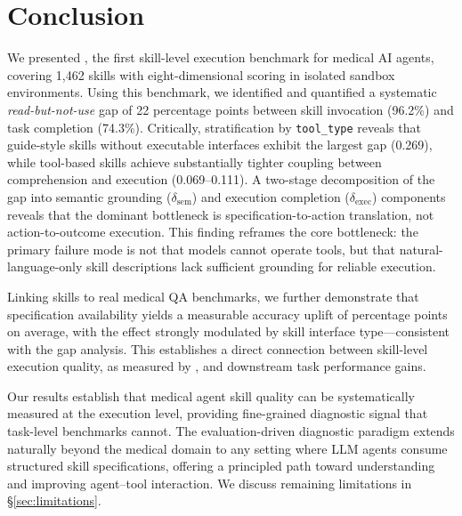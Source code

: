 \section{Conclusion}
\label{sec:conclusion}

We presented \medskillbench, the first skill-level execution benchmark for medical AI agents, covering 1,462 skills with eight-dimensional scoring in isolated sandbox environments.
Using this benchmark, we identified and quantified a systematic \emph{read-but-not-use} gap of 22 percentage points between skill invocation (96.2\%) and task completion (74.3\%).
Critically, stratification by \texttt{tool\_type} reveals that guide-style skills without executable interfaces exhibit the largest gap (0.269), while tool-based skills achieve substantially tighter coupling between comprehension and execution (0.069--0.111).
A two-stage decomposition of the \rbu gap into semantic grounding ($\delta_{\text{sem}}$) and execution completion ($\delta_{\text{exec}}$) components reveals that the dominant bottleneck is specification-to-action translation, not action-to-outcome execution.
This finding reframes the core bottleneck: the primary failure mode is not that models cannot operate tools, but that natural-language-only skill descriptions lack sufficient grounding for reliable execution.

Linking skills to real medical QA benchmarks, we further demonstrate that specification availability yields a measurable accuracy uplift of  percentage points on average, with the effect strongly modulated by skill interface type---consistent with the \rbu gap analysis.
This establishes a direct connection between skill-level execution quality, as measured by \medskillbench, and downstream task performance gains.

Our results establish that medical agent skill quality can be systematically measured at the execution level, providing fine-grained diagnostic signal that task-level benchmarks cannot.
The evaluation-driven diagnostic paradigm extends naturally beyond the medical domain to any setting where LLM agents consume structured skill specifications, offering a principled path toward understanding and improving agent--tool interaction.
We discuss remaining limitations in \S\ref{sec:limitations}.
